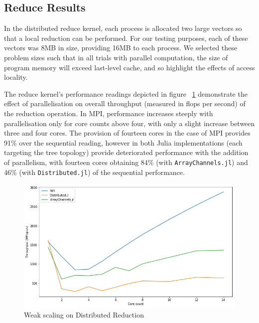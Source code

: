 \documentclass{juliacon}
\begin{document}
\subsection{Reduce Results}
\label{sec:reduce-results}

In the distributed reduce kernel, each process is allocated two large
vectors so that a local reduction can be performed. For our testing
purposes, each of these vectors was 8MB in size, providing 16MB to each
process. We selected these problem sizes such that in all trials with
parallel computation, the size of program memory will exceed last-level
cache, and so highlight the effects of access locality.

The reduce kernel's performance readings depicted in figure
~\ref{fig:plot-reduce} demonstrate the effect of parallelisation on
overall throughput (measured in flops per second) of the reduction
operation. In MPI, performance increases steeply with parallelisation
only for core counts above four, with only a slight increase between
three and four cores. The provision of fourteen cores in the case of MPI
provides 91\% over the sequential reading, however in both Julia
implementations (each targeting the tree topology) provide deteriorated
performance with the addition of parallelism, with fourteen cores
obtaining 84\% (with \texttt{ArrayChannels.jl}) and 46\% (with
\texttt{Distributed.jl}) of the sequential performance.

\begin{figure}[htb]
	\includegraphics[width=\linewidth]{figs/reduce.png}
	\caption{Weak scaling on Distributed Reduction}
	\label{fig:plot-reduce}
\end{figure}
\end{document}

